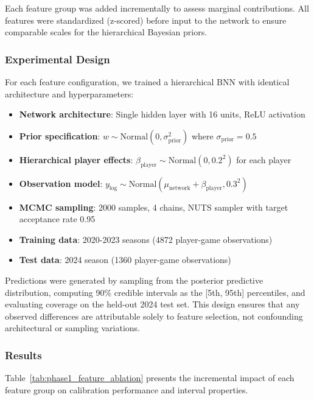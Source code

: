 Each feature group was added incrementally to assess marginal contributions. All features were standardized (z-scored) before input to the network to ensure comparable scales for the hierarchical Bayesian priors.

\subsubsection{Experimental Design}

For each feature configuration, we trained a hierarchical BNN with identical architecture and hyperparameters:

\begin{itemize}
    \item \textbf{Network architecture}: Single hidden layer with 16 units, ReLU activation
    \item \textbf{Prior specification}: $w \sim \text{Normal}(0, \sigma_{\text{prior}}^2)$ where $\sigma_{\text{prior}} = 0.5$
    \item \textbf{Hierarchical player effects}: $\beta_{\text{player}} \sim \text{Normal}(0, 0.2^2)$ for each player
    \item \textbf{Observation model}: $y_{\log} \sim \text{Normal}(\mu_{\text{network}} + \beta_{\text{player}}, 0.3^2)$
    \item \textbf{MCMC sampling}: 2000 samples, 4 chains, NUTS sampler with target acceptance rate 0.95
    \item \textbf{Training data}: 2020-2023 seasons (4872 player-game observations)
    \item \textbf{Test data}: 2024 season (1360 player-game observations)
\end{itemize}

Predictions were generated by sampling from the posterior predictive distribution, computing 90\% credible intervals as the [5th, 95th] percentiles, and evaluating coverage on the held-out 2024 test set. This design ensures that any observed differences are attributable solely to feature selection, not confounding architectural or sampling variations.

\subsubsection{Results}

Table~\ref{tab:phase1_feature_ablation} presents the incremental impact of each feature group on calibration performance and interval properties.

